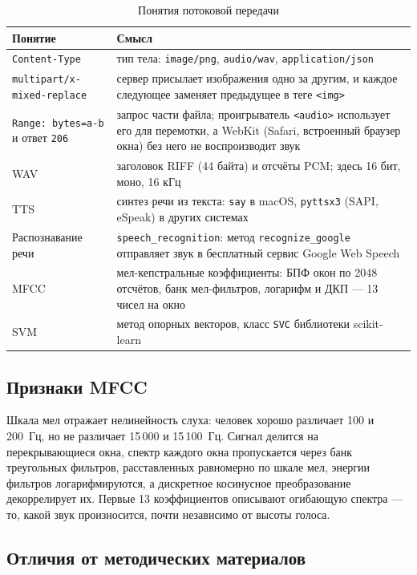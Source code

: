 \documentclass[14pt,a4paper]{extarticle}
\begin{document}
\begin{table}[H]
\caption{Понятия потоковой передачи}
\label{tab:terms}
\centering
\small
\begin{tabularx}{\textwidth}{>{\raggedright\arraybackslash}p{}L}
\toprule
Понятие & Смысл \\
\midrule
\texttt{Content-Type} & тип тела: \texttt{image/png}, \texttt{audio/wav},
\texttt{application/json} \\
\texttt{multipart/x-mixed-replace} & сервер присылает изображения одно за другим, и
каждое следующее заменяет предыдущее в теге \texttt{<img>} \\
\texttt{Range: bytes=a-b} и ответ \texttt{206} & запрос части файла; проигрыватель
\texttt{<audio>} использует его для перемотки, а WebKit (Safari, встроенный браузер
окна) без него не воспроизводит звук \\
WAV & заголовок RIFF (44 байта) и отсчёты PCM; здесь 16 бит, моно, 16 кГц \\
TTS & синтез речи из текста: \texttt{say} в macOS, \texttt{pyttsx3} (SAPI, eSpeak) в
других системах \\
Распознавание речи & \texttt{speech\_recognition}: метод \texttt{recognize\_google}
отправляет звук в бесплатный сервис Google Web Speech \\
MFCC & мел-кепстральные коэффициенты: БПФ окон по 2048 отсчётов, банк мел-фильтров,
логарифм и ДКП --- 13 чисел на окно \\
SVM & метод опорных векторов, класс \texttt{SVC} библиотеки scikit-learn \\
\bottomrule
\end{tabularx}
\end{table}

\subsection{Признаки MFCC}

Шкала мел отражает нелинейность слуха: человек хорошо различает 100 и 200~Гц, но не
различает 15\,000 и 15\,100~Гц. Сигнал делится на перекрывающиеся окна, спектр каждого
окна пропускается через банк треугольных фильтров, расставленных равномерно по шкале мел,
энергии фильтров логарифмируются, а дискретное косинусное преобразование декоррелирует
их. Первые 13 коэффициентов описывают огибающую спектра --- то, какой звук произносится,
почти независимо от высоты голоса.

\subsection{Отличия от методических материалов}
\end{document}
